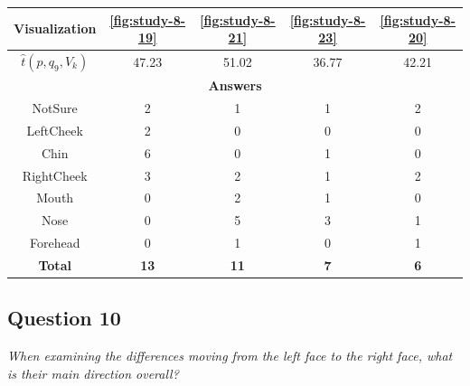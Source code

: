 \begin{center}
\begin{tabular}{| c | c | c | c | c |}
	\hline
	Visualization & \ref{fig:study-8-19} & \ref{fig:study-8-21} & \ref{fig:study-8-23} & \ref{fig:study-8-20}\\ \hline
	\(\widehat{t}(p, q_9, V_k)\) & 47.23 & 51.02 & 36.77 & 42.21\\ \hline
	\multicolumn{5}{|c|}{\bf Answers} \\ \hline
	NotSure & 2 & 1 & 1 & 2\\ \hline
	LeftCheek & 2 & 0 & 0 & 0\\ \hline
	Chin & 6 & 0 & 1 & 0\\ \hline
	RightCheek & 3 & 2 & 1 & 2\\ \hline
	Mouth & 0 & 2 & 1 & 0\\ \hline
	\rowcolor{yellow!30} Nose & 0 & 5 & 3 & 1\\ \hline
	Forehead & 0 & 1 & 0 & 1\\ \hline
	{\bf Total} & {\bf 13} & {\bf 11} & {\bf 7} & {\bf 6}\\ \hline
\end{tabular}
\end{center}
\clearpage

\subsection{Question 10}
\label{attch:complete_study_results-question10}

\begin{center}{\it When examining the differences moving from the left face to the right face, what is their main direction overall?}\end{center}

